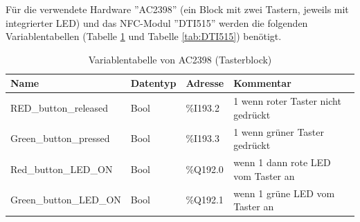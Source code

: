 Für die verwendete Hardware ''AC2398'' (ein Block mit zwei Tastern, jeweils mit integrierter LED) und das NFC-Modul ''DTI515'' werden die folgenden Variablentabellen (Tabelle \ref{tab:AC2398} und Tabelle \ref{tab:DTI515}) benötigt.

\begin{table}[h!]
	\centering
	\renewcommand{\arraystretch}{1.0} %
	\footnotesize
	\begin{tabular}{|l|l|l|l|}
		\hline
		\textbf{Name} & \textbf{Datentyp} & \textbf{Adresse} & \textbf{Kommentar}\\ \hline
		RED\_button\_released & Bool & \%I193.2 & 1 wenn roter Taster nicht gedrückt \\ \hline
		Green\_button\_pressed & Bool & \%I193.3 & 1 wenn grüner Taster gedrückt \\ \hline
		Red\_button\_LED\_ON & Bool & \%Q192.0 & wenn 1 dann rote LED vom Taster an \\ \hline
		Green\_button\_LED\_ON & Bool & \%Q192.1 & wenn 1 grüne LED vom Taster an \\ \hline
	\end{tabular}
	\caption{Variablentabelle von AC2398 (Tasterblock)}
	\label{tab:AC2398}
\end{table}
